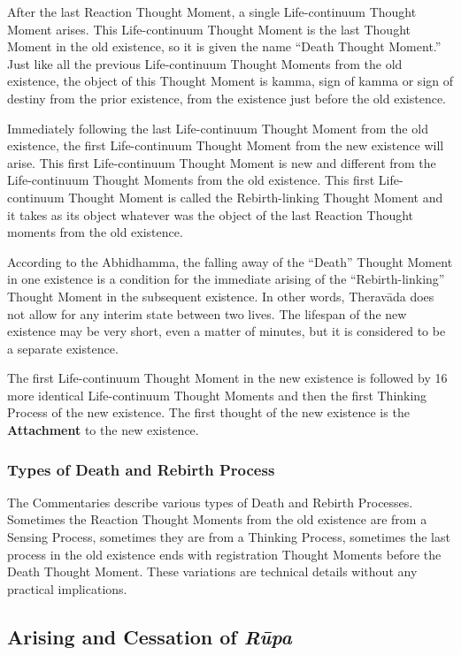 After the last Reaction Thought Moment, a single Life-continuum Thought Moment arises. This Life-continuum Thought Moment is the last Thought Moment in the old existence, so it is given the name “Death Thought Moment.” Just like all the previous Life-continuum Thought Moments from the old existence, the object of this Thought Moment is kamma, sign of kamma or sign of destiny from the prior existence, from the existence just before the old existence.

Immediately following the last Life-continuum Thought Moment from the old existence, the first Life-continuum Thought Moment from the new existence will arise. This first Life-continuum Thought Moment is new and different from the Life-continuum Thought Moments from the old existence. This first Life-continuum Thought Moment is called the Rebirth-linking Thought Moment and it takes as its object whatever was the object of the last Reaction Thought moments from the old existence.

According to the Abhidhamma, the falling away of the “Death” Thought Moment in one existence is a condition for the immediate arising of the “Rebirth-linking” Thought Moment in the subsequent existence. In other words, Theravāda does not allow for any interim state between two lives. The lifespan of the new existence may be very short, even a matter of minutes, but it is considered to be a separate existence.

The first Life-continuum Thought Moment in the new existence is followed by 16 more identical Life-continuum Thought Moments and then the first Thinking Process of the new existence. The first thought of the new existence is the \textbf{Attachment} to the new existence.

\subsubsection*{Types of Death and Rebirth Process}

The Commentaries describe various types of Death and Rebirth Processes. Sometimes the Reaction Thought Moments from the old existence are from a Sensing Process, sometimes they are from a Thinking Process, sometimes the last process in the old existence ends with registration Thought Moments before the Death Thought Moment. These variations are technical details without any practical implications.

\subsection*{Arising and Cessation of \textit{Rūpa}}

